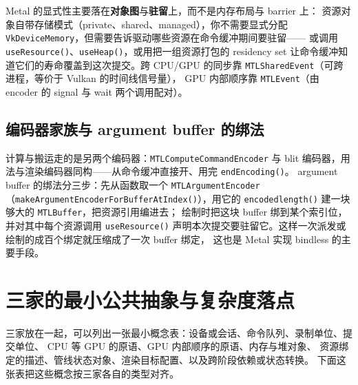 \documentclass[12pt,a4paper,fontset=fandol]{ctexbook}
\newcommand{\Fn}[1]{\texttt{#1()}}
\newcommand{\Tp}[1]{\texttt{#1}}
\newcommand{\Bk}{\discretionary{}{}{}}
\newcommand{\Lang}[1]{\textsf{#1}}
\newcommand{\DomCPU}{\Lang{CPU}}
\newcommand{\DomGPU}{\Lang{GPU}}
\begin{document}
Metal 的显式性主要落在\textbf{对象图}与\textbf{驻留}上，而不是内存布局与 barrier 上：
资源对象自带存储模式（private、shared、managed），你不需要显式分配
\Tp{Vk\Bk Device\Bk Memory}，但需要告诉驱动哪些资源在命令缓冲期间要驻留——
或调用 \Fn{use\Bk Resource}、\Fn{use\Bk Heap}，或用把一组资源打包的 residency
set 让命令缓冲知道它们的寿命覆盖到这次提交。跨 \DomCPU{}/{\Bk}\DomGPU{} 的同步靠
\Tp{MTL\Bk Shared\Bk Event}（可跨进程，等价于 Vulkan 的时间线信号量），
\DomGPU{} 内部顺序靠 \Tp{MTL\Bk Event}（由 encoder 的 signal 与 wait
两个调用配对）。

\subsection{编码器家族与 argument buffer 的绑法}
计算与搬运走的是另两个编码器：\Tp{MTL\Bk Compute\Bk Command\Bk Encoder} 与 blit
编码器，用法与渲染编码器同构——从命令缓冲直接开、用完 \Fn{endEncoding}。
argument buffer 的绑法分三步：先从函数取一个 \Tp{MTL\Bk Argument\Bk Encoder}
（\Fn{make\Bk Argument\Bk Encoder\Bk For\Bk Buffer\Bk At\Bk Index}），用它的
\Fn{encoded\Bk length} 建一块够大的 \Tp{MTL\Bk Buffer}，把资源引用编进去；
绘制时把这块 buffer 绑到某个索引位，并对其中每个资源调用 \Fn{use\Bk Resource}
声明本次提交要驻留它。这样一次派发或绘制的成百个绑定就压缩成了一次 buffer 绑定，
这也是 Metal 实现 bindless 的主要手段。

\section{三家的最小公共抽象与复杂度落点}

三家放在一起，可以列出一张最小概念表：设备或会话、命令队列、录制单位、提交单位、
\DomCPU{} 等 \DomGPU{} 的原语、\DomGPU{} 内部顺序的原语、内存与堆对象、
资源绑定的描述、管线状态对象、渲染目标配置、以及跨阶段依赖或状态转换。
下面这张表把这些概念按三家各自的类型对齐。
\end{document}
